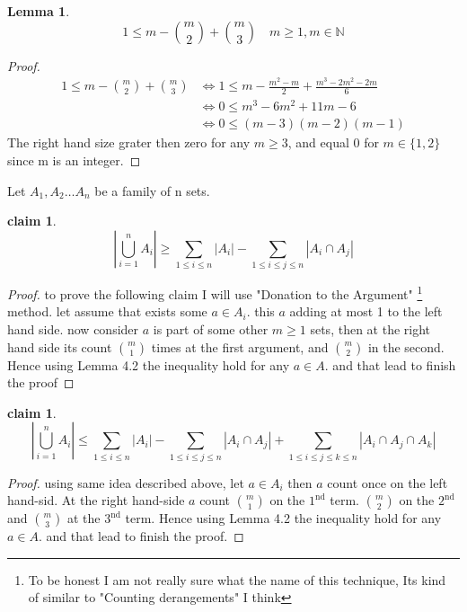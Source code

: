 \documentclass[12pt]{article}
\newtheorem{lemma}[theorem]{Lemma}
\newtheorem{claim}[theorem]{claim}
\begin{document}
\hrulefill
\begin{lemma}
\[1\le m-{m \choose 2}+{m\choose 3} \quad m\ge 1, m\in \mathbb{N}
\]\end{lemma}
\begin{proof}
\begin{align*}
1\le m-{m \choose 2}+{m\choose 3} &\Leftrightarrow 1\le m-\frac{m^2-m}{2}+\frac{m^3-2m^2-2m}{6}
\\
 &\Leftrightarrow 0 \le m^3 -6m^2+11m-6
 \\
  &\Leftrightarrow0\le  (m-3)(m-2)(m-1)
\end{align*} 
 The right hand size grater then zero for any $m\ge 3$, and equal 0  for $m\in\{1,2\}$ since m is an integer.
\end{proof}

Let $A_1,A_2\dots A_n$ be a family of n sets.

\begin{claim}\[
\left|\bigcup_{i=1}^nA_i \right|\ge \sum_{1\le i\le n} |A_i|-
\sum_{1\le i\le j\le n}|A_i\cap A_j|
\]
\end{claim}
\begin{proof}to prove the following claim I will use "Donation to the Argument" \footnote{To be honest I am not really sure what the name of this technique, Its kind of similar to "Counting derangements" I think } method. let assume that exists some $a\in A_i$. this $a$ adding at most 1 to the left hand side. now consider  $a$ is part of some other $m\ge 1$ sets, then at the right hand side   its count $m \choose 1$ times at the first argument, and $m\choose 2$ in the second. Hence using Lemma 4.2 the inequality hold for any $a\in A$. and that lead to finish the proof 
\end{proof}
\begin{claim}\[
\left|\bigcup_{i=1}^nA_i \right|\le \sum_{1\le i\le n} |A_i|-
\sum_{1\le i\le j\le n}|A_i\cap A_j|+\sum_{1\le i\le j\le k\le n}|A_i\cap A_j\cap A_k|
\]
\end{claim}
\begin{proof} using same idea described above, let $a\in A_i$
then $a$ count once on the left hand-sid. At the right hand-side $a$ count $m \choose 1$ on the $1^{\text{nd}}$ term. $m \choose 2$ on the $2^{\text{nd}}$ and $m \choose 3$ at the $3^{\text{nd}}$ term. Hence using Lemma 4.2 the inequality hold for any $a\in A$. and that lead to finish the proof. 
\end{proof}
\end{document}
